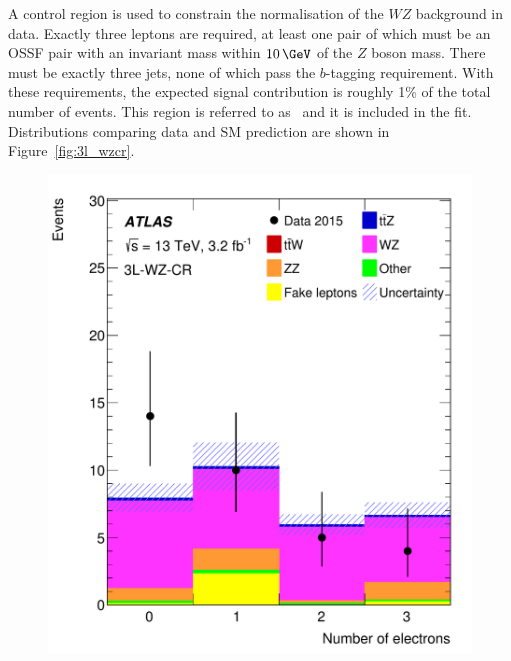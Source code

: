 A control region is used to constrain the normalisation of the $WZ$ background
in data. Exactly three leptons are required, at least one pair of which must 
be an OSSF pair with an invariant mass within $10\,\GeV$ of the $Z$ boson mass. 
There must be exactly three jets,
none of which pass the $b$-tagging requirement.  With these requirements, the
expected \ttZ signal contribution is roughly 1\% of the total number of events.
This region is referred to as \TLCR\ and it is included in the fit. Distributions
comparing data and SM prediction are shown in Figure~\ref{fig:3l_wzcr}.

\begin{figure}[htbp]
\centering
\includegraphics[width=\twofigwidth]{CRWZnEl}

\end{figure}
